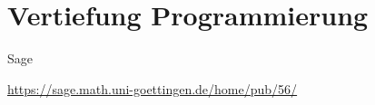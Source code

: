 \documentclass[hyperref={xetex}]{beamer}
\begin{document}
\section{Vertiefung Programmierung}


\begin{frame}{Sage}
    \begin{center}
        \url{https://sage.math.uni-goettingen.de/home/pub/56/}
    \end{center}
\end{frame}

% 



\end{document}
